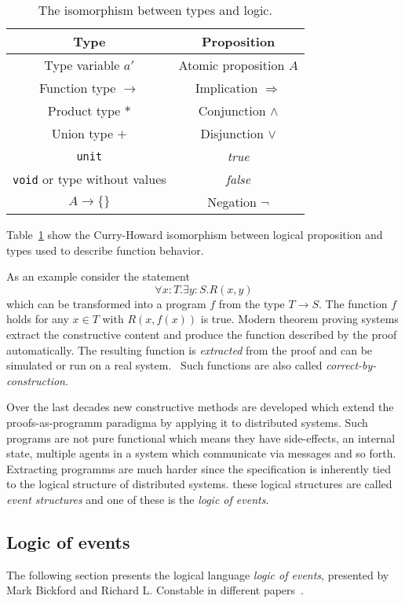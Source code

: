 \begin{table}[h]
  \centering
  \begin{tabular}{c|c}
    Type & Proposition\\\hline
    Type variable $a'$ & Atomic proposition $A$\\
    Function type $\rightarrow$ & Implication $\Rightarrow$\\
    Product type $*$ & Conjunction $\wedge$\\
    Union type $+$ & Disjunction $\vee$\\
    \texttt{unit} & \textit{true} \\
    \texttt{void} or type without values & \textit{false}\\
    $A\rightarrow \{\}$ & Negation $\neg$ \\
  \end{tabular}
  \caption{The isomorphism between types and logic.}
  \label{tab:proofsasprogs}
\end{table}

Table~\ref{tab:proofsasprogs} show the Curry-Howard isomorphism between
logical proposition and types used to describe function behavior.

As an example consider the statement
\[
  \forall x:T.\exists y:S.R(x,y)
\]
which can be transformed into a program $f$ from the type $T\rightarrow S$.
The function $f$ holds for any $x\in T$ with $R(x,f(x))$ is true.
Modern theorem proving systems extract the constructive content and
produce the function described by the proof automatically.
The resulting function is \textit{extracted} from the proof
and can be simulated or run on a real system.~\cite{bickford2009component}
Such functions are also called \textit{correct-by-construction}.

Over the last decades new constructive methods are developed which
extend the proofs-as-programm paradigma by applying it to distributed
systems. Such programs are not pure functional which means they have
side-effects, an internal state, multiple agents in a system which
communicate via messages and so forth. Extracting programms
are much harder since the specification is inherently tied to
the logical structure of distributed systems. these logical
structures are called \textit{event structures} and one of these
is the \textit{logic of events}.~\cite{bickford2009component}


\subsection{Logic of events}
The following section presents the logical language \textit{logic of events},
presented by Mark Bickford and Richard L. Constable in different
papers~\cite{bickford2003logic, bickford2005causal, bickford2009component}.

